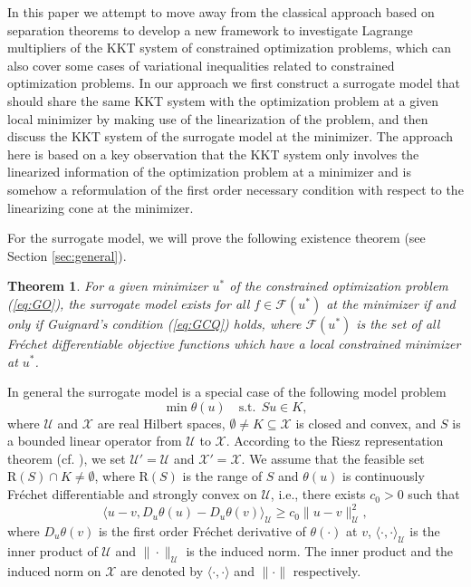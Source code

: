 \documentclass[leqno]{amsart}
\newtheorem{theorem}{Theorem}[section]
\theoremstyle{definition}
\begin{document}
In this paper we attempt to move away from the classical approach based on separation theorems to develop a new framework to investigate Lagrange multipliers of the KKT system of constrained optimization problems, which can also cover some cases of variational inequalities related to constrained optimization problems.  In our approach we first construct a surrogate model that should share the same KKT system with the optimization problem at a given local minimizer by making use of the linearization of the problem, and then discuss the KKT system of the surrogate model at the minimizer. The approach here is based on a key observation that the KKT system only involves the linearized information of the optimization problem at a minimizer and is somehow a reformulation of the first order necessary condition with respect to the linearizing cone at the minimizer.

For the surrogate model,  we will prove the following existence theorem (see Section \ref{sec:general}).
\begin{theorem}\label{thm:sm_e}
For a given minimizer $u^*$ of the constrained optimization problem (\ref{eq:GO}),  the surrogate model exists for all $f\in \mathcal{F}(u^*)$ at the minimizer if and only if Guignard's condition (\ref{eq:GCQ}) holds, where $\mathcal{F}(u^*)$ is the set of all Fr\'{e}chet differentiable objective functions which have a local constrained minimizer at $u^*$. 
\end{theorem}

In general the surrogate model is a special case of the following model problem
\begin{equation}\label{eq:sm_g}
\min \theta(u)\quad \mbox{s.t.}\ \ Su \in K,
\end{equation} 
where $\mathcal{U}$ and $\mathcal{X}$ are real Hilbert spaces, $\emptyset \neq K\subseteq \mathcal{X}$ is closed and convex, and $S$ is a bounded linear operator from $\mathcal{U}$ to $\mathcal{X}$. According to the Riesz representation theorem (cf. \cite[Theorem 3.4, Chapter I]{conway2007course}), we set $\mathcal{U}' = \mathcal{U}$ and $\mathcal{X}' = \mathcal{X}$. We assume that the feasible set $\mathrm{R}(S)\cap K\neq \emptyset$, where $\mathrm{R}(S)$ is the range of $S$ and $\theta(u)$ is continuously Fr\'{e}chet differentiable and strongly convex on $\mathcal{U}$, i.e., there exists $c_0>0$ such that 
\begin{equation}\label{eq:theta_sc}
\langle u - v, D_u\theta(u) - D_u\theta(v)\rangle_\mathcal{U} \geq c_0 \|u - v\|^2_\mathcal{U},
\end{equation}
where $D_u\theta(v)$ is the first order Fr\'{e}chet derivative of $\theta(\cdot)$ at $v$, $\langle\cdot, \cdot\rangle_\mathcal{U}$ is the inner product of $\mathcal{U}$ and $\|\cdot\|_{\mathcal{U}}$ is the induced norm. The inner product and the induced norm on $\mathcal{X}$ are denoted by $\langle\cdot, \cdot\rangle$ and $\|\cdot\|$ respectively.
\end{document}
